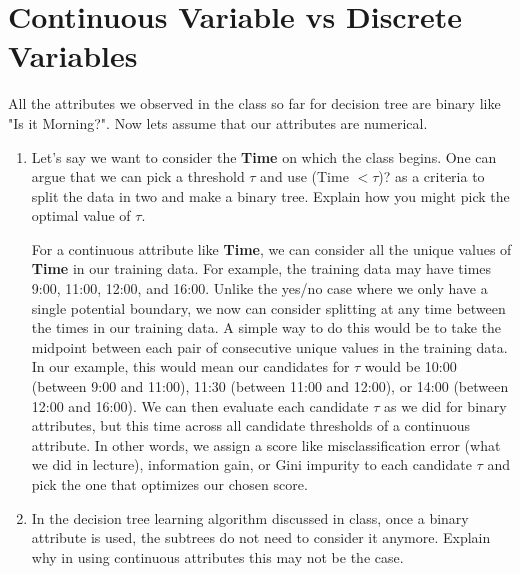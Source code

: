 \documentclass[fleqn]{article}
\begin{document}
\section{Continuous Variable vs Discrete Variables}
All the attributes we observed in the class so far for decision tree are binary like "Is it Morning?". Now lets assume that our attributes are numerical.
\begin{enumerate}
    \item  Let's say we want to consider the \textbf{Time} on which the class begins. One can argue that we can pick a threshold $\tau$ and use (Time $< \tau$)? as a criteria to split the data in two and make a binary tree. Explain how you might pick the optimal value of $\tau$.

      For a continuous attribute like \textbf{Time}, we can consider all the unique values of \textbf{Time} in our training data.
      For example, the training data may have times 9:00, 11:00, 12:00, and 16:00.
      Unlike the yes/no case where we only have a single potential boundary, we now can consider splitting at any time between the times in our training data. 
      A simple way to do this would be to take the midpoint between each pair of consecutive unique values in the training data.
      In our example, this would mean our candidates for $\tau$ would be 10:00 (between 9:00 and 11:00), 11:30 (between 11:00 and 12:00), or 14:00 (between 12:00 and 16:00).
      We can then evaluate each candidate $\tau$ as we did for binary attributes, but this time across all candidate thresholds of a continuous attribute.
      In other words, we assign a score like misclassification error (what we did in lecture), information gain, or Gini impurity to each candidate $\tau$ and pick the one that optimizes our chosen score.


    \item In the decision tree learning algorithm discussed in class, once a binary attribute is used, the subtrees do not need to consider it anymore. Explain why in using continuous attributes this may not be the case.
\end{enumerate}
\end{document}
